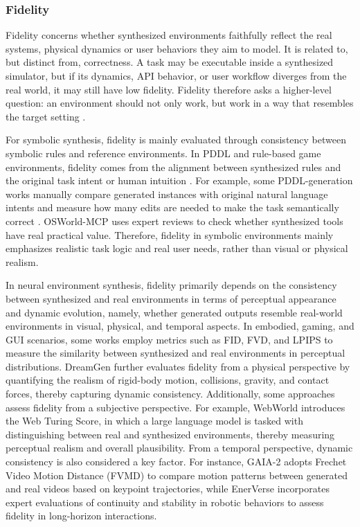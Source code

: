 \subsubsection{Fidelity}

Fidelity concerns whether synthesized environments faithfully reflect the real systems, physical dynamics or user behaviors they aim to model. It is related to, but distinct from, correctness. A task may be executable inside a synthesized simulator, but if its dynamics, API behavior, or user workflow diverges from the real world, it may still have low fidelity. Fidelity therefore asks a higher-level question: an environment should not only work, but work in a way that resembles the target setting \cite{WebArena, Genie_Envisioner, Matrix-Game}.

For symbolic synthesis, fidelity is mainly evaluated through consistency between symbolic rules and reference environments. In PDDL and rule-based game environments, fidelity comes from the alignment between synthesized rules and the original task intent or human intuition \cite{VML_PDDL, Exploration_Walk, GVGAI-LLM}. For example, some PDDL-generation works manually compare generated instances with original natural language intents and measure how many edits are needed to make the task semantically correct \cite{VML_PDDL}. OSWorld-MCP \cite{OSWorld-MCP} uses expert reviews to check whether synthesized tools have real practical value. Therefore, fidelity in symbolic environments mainly emphasizes realistic task logic and real user needs, rather than visual or physical realism.

In neural environment synthesis, fidelity primarily depends on the consistency between synthesized and real environments in terms of perceptual appearance and dynamic evolution, namely, whether generated outputs resemble real-world environments in visual, physical, and temporal aspects. In embodied, gaming, and GUI scenarios, some works \cite{DIAMOND, GameNGen, GAIA-2} employ metrics such as FID, FVD, and LPIPS to measure the similarity between synthesized and real environments in perceptual distributions. DreamGen \cite{DreamGen} further evaluates fidelity from a physical perspective by quantifying the realism of rigid-body motion, collisions, gravity, and contact forces, thereby capturing dynamic consistency. Additionally, some approaches assess fidelity from a subjective perspective. For example, WebWorld \cite{WebWorld} introduces the Web Turing Score, in which a large language model is tasked with distinguishing between real and synthesized environments, thereby measuring perceptual realism and overall plausibility. From a temporal perspective, dynamic consistency is also considered a key factor. For instance, GAIA-2 \cite{GAIA-2} adopts Frechet Video Motion Distance (FVMD) to compare motion patterns between generated and real videos based on keypoint trajectories, while EnerVerse \cite{EnerVerse} incorporates expert evaluations of continuity and stability in robotic behaviors to assess fidelity in long-horizon interactions.



